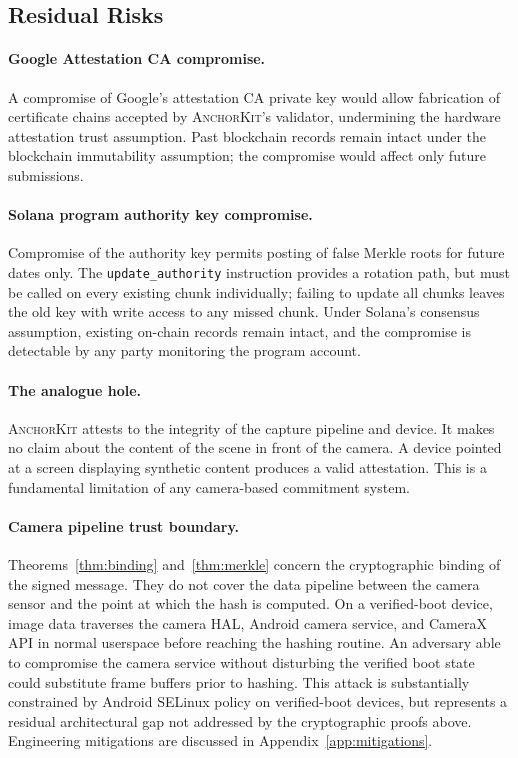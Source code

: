 \documentclass[11pt,a4paper]{article}
\newcommand{\AK}{\textsc{AnchorKit}\xspace}
\begin{document}
\subsection{Residual Risks}
\label{sec:residual}

\paragraph{Google Attestation CA compromise.} A compromise of Google's
attestation CA private key would allow fabrication of certificate chains
accepted by \AK's validator, undermining the hardware attestation trust
assumption.  Past blockchain records remain intact under the blockchain
immutability assumption; the compromise would affect only future submissions.

\paragraph{Solana program authority key compromise.} Compromise of the
authority key permits posting of false Merkle roots for future dates only.  The
\texttt{update\_authority} instruction provides a rotation path, but must be
called on every existing chunk individually; failing to update all chunks leaves
the old key with write access to any missed chunk.  Under Solana's consensus
assumption, existing on-chain records remain intact, and the compromise is
detectable by any party monitoring the program account.

\paragraph{The analogue hole.} \AK attests to the integrity of the capture
pipeline and device.  It makes no claim about the content of the scene in front
of the camera.  A device pointed at a screen displaying synthetic content
produces a valid attestation.  This is a fundamental limitation of any
camera-based commitment system.

\paragraph{Camera pipeline trust boundary.} Theorems~\ref{thm:binding}
and~\ref{thm:merkle} concern the cryptographic binding of the signed message.
They do not cover the data pipeline between the camera sensor and the point at
which the hash is computed.  On a verified-boot device, image data traverses the
camera HAL, Android camera service, and CameraX API in normal userspace before
reaching the hashing routine.  An adversary able to compromise the camera
service without disturbing the verified boot state could substitute frame
buffers prior to hashing.  This attack is substantially constrained by Android
SELinux policy on verified-boot devices, but represents a residual architectural
gap not addressed by the cryptographic proofs above.  Engineering mitigations
are discussed in Appendix~\ref{app:mitigations}.
\end{document}

